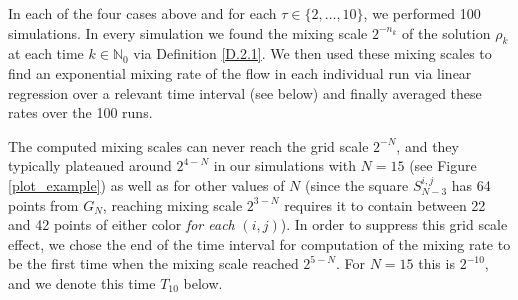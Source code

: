 \documentclass[12pt]{article}
\numberwithin{figure}{section}
\numberwithin{equation}{section}
\newcommand{\bbN}{{\mathbb{N}}}
\begin{document}
In each of the four  cases above and for each $\tau\in\{2,\dots,10\}$, we performed 100 simulations.  In every simulation we found the mixing scale $2^{-n_k}$ of the solution $\rho_k$ at each time $k\in\bbN_0$ via Definition \ref{D.2.1}.
We then used these mixing scales to find an exponential mixing rate of the flow in each individual run via linear regression over a relevant time interval (see below) and finally averaged these rates over the 100 runs.

The computed mixing scales can never reach the grid scale $2^{-N}$, and they typically plateaued around $2^{4-N}$ in our simulations  with $N=15$ (see Figure \ref{plot_example}) as well as for other values of $N$ (since the square $S_{N-3}^{i,j}$ has 64 points from $G_N$, reaching mixing scale $2^{3-N}$ requires it to contain between 22 and 42 points of either color {\it for each} $(i,j)$).  In order to suppress this grid scale effect, we chose the end of the time interval for computation of the mixing rate to be the first time when the mixing scale reached $2^{5-N}$.  For $N=15$ this is $2^{-10}$, and we denote this time $T_{10}$ below.
\end{document}
